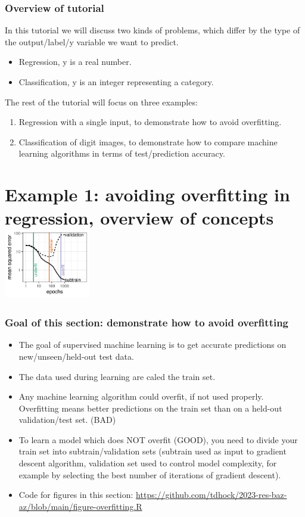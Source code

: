 \documentclass{beamer}
\begin{document}
\begin{frame}
  \frametitle{Overview of tutorial}
  In this tutorial we will discuss two kinds of problems, which
  differ by the type of the output/label/y variable we want to predict.
  \begin{itemize}
  \item Regression, y is a real number.
  \item Classification, y is an integer representing a category.
  \end{itemize}

  The rest of the tutorial will focus on three examples:
  \begin{enumerate}
  \item Regression with a single input, to demonstrate how to avoid
    overfitting.
  \item Classification of digit images, to demonstrate how to compare
    machine learning algorithms in terms of test/prediction accuracy.
  \end{enumerate}
\end{frame}

\section{Example 1: avoiding overfitting in regression, overview of concepts
\includegraphics[height=3cm]{figure-overfitting-paper-loss}}   
 
\begin{frame}
  \frametitle{Goal of this section: demonstrate how to avoid
    overfitting}
  \begin{itemize}
  \item The goal of supervised machine learning is to get accurate
    predictions on new/unseen/held-out test data.
  \item The data used during learning are caled the train set.
  \item Any machine learning algorithm could overfit, if not used
    properly. Overfitting means better predictions on the train set
    than on a held-out validation/test set. (BAD)
  \item To learn a model which does NOT overfit (GOOD), you need to
    divide your train set into subtrain/validation sets (subtrain used
    as input to gradient descent algorithm, validation set used to
    control model complexity, for example by selecting the best number
    of iterations of gradient descent).
  \item Code for figures in this section:
    \url{https://github.com/tdhock/2023-res-baz-az/blob/main/figure-overfitting.R}
  \end{itemize}
\end{frame}
\end{document}
